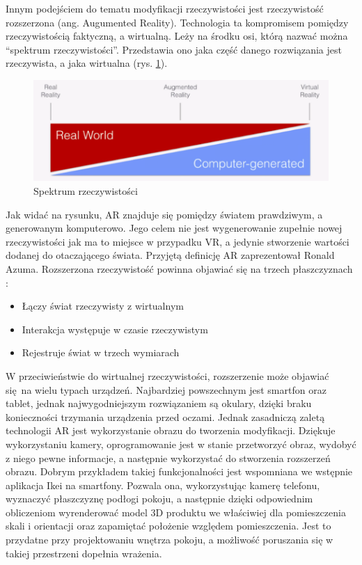 \documentclass[12pt,twoside,polish]{article}
\begin{document}
Innym podejściem do tematu modyfikacji rzeczywistości jest rzeczywistość rozszerzona (ang. Augumented Reality). Technologia ta kompromisem pomiędzy rzeczywistością faktyczną, a wirtualną. Leży na środku osi, którą nazwać można \enquote{spektrum rzeczywistości}. Przedstawia ono jaka część danego rozwiązania jest rzeczywista, a jaka wirtualna (rys. \ref{realityspectrum}).

\begin{figure}
	\centering
	\includegraphics[width=\textwidth]{reality-spectrum}
	\caption{Spektrum rzeczywistości \cite{realityspectrum}}
	\label{realityspectrum}
\end{figure}

Jak widać na rysunku, AR znajduje się pomiędzy światem prawdziwym, a generowanym komputerowo. Jego celem nie jest wygenerowanie zupełnie nowej rzeczywistości jak ma to miejsce w przypadku VR, a jedynie stworzenie wartości dodanej do otaczającego świata. Przyjętą definicję AR zaprezentował Ronald Azuma. Rozszerzona rzeczywistość powinna objawiać się na trzech płaszczyznach \cite{azuma}:
\begin{itemize}
	\item Łączy świat rzeczywisty z wirtualnym
	\item Interakcja występuje w czasie rzeczywistym
	\item Rejestruje świat w trzech wymiarach
\end{itemize}

W przeciwieństwie do wirtualnej rzeczywistości, rozszerzenie może objawiać się na wielu typach urządzeń. Najbardziej powszechnym jest smartfon oraz tablet, jednak najwygodniejszym rozwiązaniem są okulary, dzięki braku konieczności trzymania urządzenia przed oczami. Jednak zasadniczą zaletą technologii AR jest wykorzystanie obrazu do tworzenia modyfikacji. Dziękuje wykorzystaniu kamery, oprogramowanie jest w stanie przetworzyć obraz, wydobyć z niego pewne informacje, a następnie wykorzystać do stworzenia rozszerzeń obrazu. Dobrym przykładem takiej funkcjonalności jest wspomniana we wstępnie aplikacja Ikei na smartfony. Pozwala ona, wykorzystując kamerę telefonu, wyznaczyć płaszczyznę podłogi pokoju, a następnie dzięki odpowiednim obliczeniom wyrenderować model 3D produktu we właściwiej dla pomieszczenia skali i orientacji oraz zapamiętać położenie względem pomieszczenia. Jest to przydatne przy projektowaniu wnętrza pokoju, a możliwość poruszania się w takiej przestrzeni dopełnia wrażenia.
\end{document}
